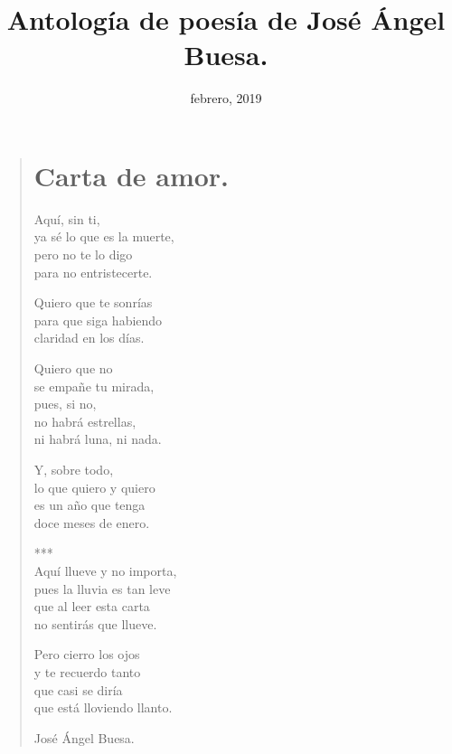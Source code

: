 \documentclass[11pt, portrait, twoside, notitlepage, openright]{book}
\title{\Huge{Antología de poesía de José Ángel Buesa.}}
\author{\Huge{}}
\date{febrero, 2019}
\begin{document}
\maketitle
\tableofcontents
\clearpage
\onehalfspacing


\thispagestyle{empty}

\newpage

\thispagestyle{empty}
\begin{verse}
\begin{center}
\section{Carta de amor.}
\end{center}
Aquí, sin ti,\\
ya sé lo que es la muerte,\\
pero no te lo digo\\
para no entristecerte.
\newline

Quiero que te sonrías\\
para que siga habiendo\\
claridad en los días.
\newline

Quiero que no\\
se empañe tu mirada,\\
pues, si no,\\
no habrá estrellas,\\
ni habrá luna, ni nada.
\newline

Y, sobre todo,\\
lo que quiero y quiero\\
es un año que tenga\\
doce meses de enero.

***\\

Aquí llueve y no importa,\\
pues la lluvia es tan leve\\
que al leer esta carta\\
no sentirás que llueve.
\newline

Pero cierro los ojos\\ 
y te recuerdo tanto\\
que casi se diría\\
que está lloviendo llanto.
\newline

\begin{flushright}
José Ángel Buesa.
\end{flushright}
\end{verse}
\end{document}
